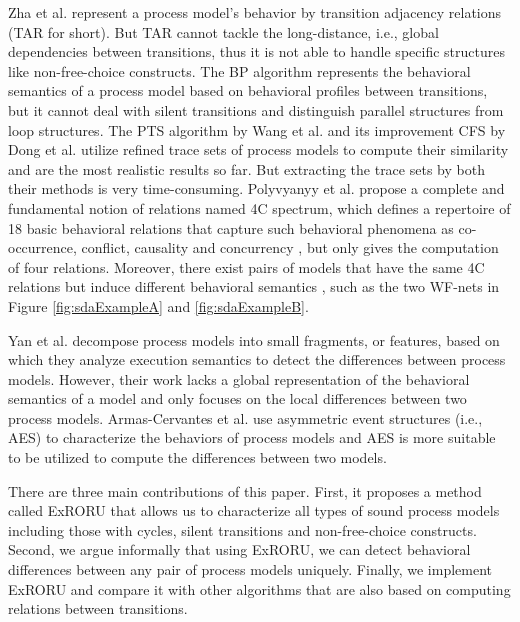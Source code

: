 \documentclass{llncs}
\begin{document}
Zha et al. \cite{zha2010workflow} represent a process model's behavior by transition adjacency relations (TAR for short). But TAR cannot tackle the long-distance, i.e., global dependencies between transitions, thus it is not able to handle specific structures like non-free-choice constructs. The BP algorithm \cite{weidlich2011efficient} represents the behavioral semantics of a process model based on behavioral profiles between transitions, but it cannot deal with silent transitions and distinguish parallel structures from loop structures. The PTS algorithm by Wang et al. \cite{wang2010behavioral} and its improvement CFS by Dong et al. \cite{dong2014cfs} utilize refined trace sets of process models to compute their similarity and are the most realistic results so far. But extracting the trace sets by both their methods is very time-consuming. Polyvyanyy et al. \cite{polyvyanyy20144c} propose a complete and fundamental notion of relations named 4C spectrum, which defines a repertoire of 18 basic behavioral relations that capture such behavioral phenomena as co-occurrence, conflict, causality and concurrency \cite{armas2014suitability}, but \cite{polyvyanyy20144c} only gives the computation of four relations. Moreover, there exist pairs of models that have the same 4C relations but induce different behavioral semantics \cite{armas2014suitability}, such as the two WF-nets in Figure \ref{fig:sdaExampleA} and \ref{fig:sdaExampleB}.

Yan et al. \cite{yan2014efficient} decompose process models into small fragments, or features, based on which they analyze execution semantics to detect the differences between process models. However, their work lacks a global representation of the behavioral semantics of a model and only focuses on the local differences between two process models. Armas-Cervantes et al. \cite{armas2014behavioral} use asymmetric event structures (i.e., AES) to characterize the behaviors of process models and AES is more suitable to be utilized to compute the differences between two models.

There are three main contributions of this paper. First, it proposes a method called ExRORU that allows us to characterize all types of sound process models including those with cycles, silent transitions and non-free-choice constructs. Second, we argue informally that using ExRORU, we can detect behavioral differences between any pair of process models uniquely. Finally, we implement ExRORU and compare it with other algorithms that are also based on computing relations between transitions.
\end{document}
